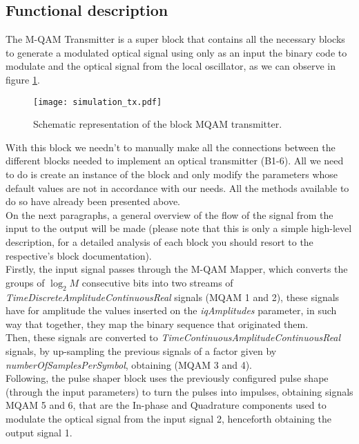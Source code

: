\subsection*{Functional description}

The M-QAM Transmitter is a super block that contains all the necessary blocks to generate a modulated optical signal using only as an input the binary code to modulate and the optical signal from the local oscillator, as we can observe in figure \ref{MQAM_transmitter_block_diagram}.

\begin{figure}[H]
	\centering \texttt{[image: simulation\_tx.pdf]}
	\caption{Schematic representation of the block MQAM transmitter.}\label{MQAM_transmitter_block_diagram}
\end{figure}
With this block we needn't to manually make all the connections between the different blocks needed to implement an optical transmitter (B1-6). All we need to do is create an instance of the block and only modify the parameters whose default values are not in accordance with our needs. All the methods available to do so have already been presented above.\\
On the next paragraphs, a general overview of the flow of the signal from the input to the output will be made (please note that this is only a simple high-level description, for a detailed analysis of each block you should resort to the respective's block documentation).\\
Firstly, the input signal passes through the M-QAM Mapper, which converts the groups of $\log_2M$ consecutive bits into two streams of \textit{TimeDiscreteAmplitudeContinuousReal} signals (MQAM 1 and 2), these signals have for amplitude the values inserted on the \textit{iqAmplitudes} parameter, in such way that together, they map the binary sequence that originated them.\\
Then, these signals are converted to \textit{TimeContinuousAmplitudeContinuousReal} signals, by up-sampling the previous signals of a factor given by \textit{numberOfSamplesPerSymbol}, obtaining (MQAM 3 and 4).\\
Following, the pulse shaper block uses the previously configured pulse shape (through the input parameters) to turn the pulses into impulses, obtaining signals MQAM 5 and 6, that are the In-phase and Quadrature components used to modulate the optical signal from the input signal 2, henceforth obtaining the output signal 1.\\

